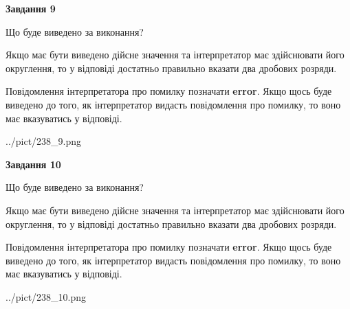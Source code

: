 \documentclass[12pt, ukrainian]{article}
\begin{document}
{\begin {Large}
{\begin {center}\textbf{Завдання 9}\end {center}}\par
Що буде виведено за виконання? \par

Якщо має бути виведено дійсне значення та інтерпретатор має здійснювати його округлення, 
то у відповіді достатньо правильно вказати два дробових розряди.

Повідомлення інтерпретатора про помилку позначати \textbf{error}.
Якщо щось буде виведено до того, як інтерпретатор видасть повідомлення про помилку, 
то воно має вказуватись у відповіді. \par

\begin{center}
	{../pict/238_9.png}
\end{center}
\newpage

{\begin {center}\textbf{Завдання 10}\end {center}}\par
Що буде виведено за виконання? \par

Якщо має бути виведено дійсне значення та інтерпретатор має здійснювати його округлення, 
то у відповіді достатньо правильно вказати два дробових розряди.

Повідомлення інтерпретатора про помилку позначати \textbf{error}.
Якщо щось буде виведено до того, як інтерпретатор видасть повідомлення про помилку, 
то воно має вказуватись у відповіді. \par

\begin{center}
	{../pict/238_10.png}
\end{center}
\newpage

\end {Large}}
\end{document}
